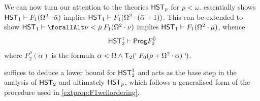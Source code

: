 \documentclass[UKenglish,cleveref,DIV=12]{scrartcl}
\let\forall\forallAlt
\theoremstyle{definition}
\theoremstyle{definition}
\begin{document}
We can now turn our attention to the theories $\mathsf{HST}_p$ for $p<\omega$.
 essentially shows $\mathsf{HST}_1\vdash
F_1(\Omega^2\cdot\bar\alpha)$ implies $\mathsf{HST}_1\vdash
F_1(\Omega^2\cdot(\bar\alpha+1))$. This can be extended to show $\HST_1\proves\forall\nu<\bar\mu\,F_1(\Omega^2\cdot\nu)$ implies $\mathsf{HST}_1\vdash F_1(\Omega^2\cdot\bar\mu)$, whence
\begin{gather}\label{eqn:Fbwell1}
  \mathsf{HST}_2^1\vdash \mathsf{Prog}  F^{\bar 0}_2
\end{gather}
where $F_2^{\rho}(\alpha)$ is the formula $\alpha<\Omega\land\mathsf{T}_2(\ulcorner{F_0(\rho+\Omega^2\cdot\alpha)}\urcorner)$.

 suffices to deduce a lower bound for $\mathsf{HST}_2^1$ and acts as
the base step in the analysis of $\mathsf{HST}_2$ and ultimately $\mathsf{HST}_p$, which follows a
generalised form of the procedure used in \cref{extprop:F1wellordering}.
\end{document}

